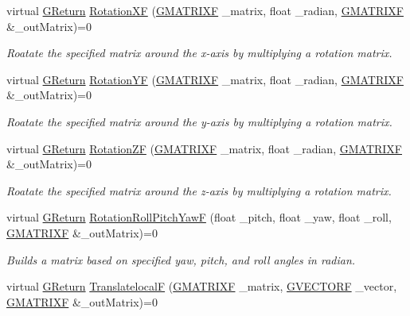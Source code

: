 \begin{DoxyCompactItemize}
virtual \hyperlink{namespaceGW_a67a839e3df7ea8a5c5686613a7a3de21}{G\+Return} \hyperlink{classGW_1_1MATH_1_1GMatrix_acd8ef29804a2d807876b2f0a22a1f9b4}{Rotation\+XF} (\hyperlink{structGW_1_1MATH_1_1GMATRIXF}{G\+M\+A\+T\+R\+I\+XF} \+\_\+matrix, float \+\_\+radian, \hyperlink{structGW_1_1MATH_1_1GMATRIXF}{G\+M\+A\+T\+R\+I\+XF} \&\+\_\+out\+Matrix)=0
\begin{DoxyCompactList}\small\item\em Roatate the specified matrix around the x-\/axis by multiplying a rotation matrix. \end{DoxyCompactList}\item 
virtual \hyperlink{namespaceGW_a67a839e3df7ea8a5c5686613a7a3de21}{G\+Return} \hyperlink{classGW_1_1MATH_1_1GMatrix_afe5fa5399691dc690272dad5d3697ff9}{Rotation\+YF} (\hyperlink{structGW_1_1MATH_1_1GMATRIXF}{G\+M\+A\+T\+R\+I\+XF} \+\_\+matrix, float \+\_\+radian, \hyperlink{structGW_1_1MATH_1_1GMATRIXF}{G\+M\+A\+T\+R\+I\+XF} \&\+\_\+out\+Matrix)=0
\begin{DoxyCompactList}\small\item\em Roatate the specified matrix around the y-\/axis by multiplying a rotation matrix. \end{DoxyCompactList}\item 
virtual \hyperlink{namespaceGW_a67a839e3df7ea8a5c5686613a7a3de21}{G\+Return} \hyperlink{classGW_1_1MATH_1_1GMatrix_abce415225da8aa2592e1ef495fd9996b}{Rotation\+ZF} (\hyperlink{structGW_1_1MATH_1_1GMATRIXF}{G\+M\+A\+T\+R\+I\+XF} \+\_\+matrix, float \+\_\+radian, \hyperlink{structGW_1_1MATH_1_1GMATRIXF}{G\+M\+A\+T\+R\+I\+XF} \&\+\_\+out\+Matrix)=0
\begin{DoxyCompactList}\small\item\em Roatate the specified matrix around the z-\/axis by multiplying a rotation matrix. \end{DoxyCompactList}\item 
virtual \hyperlink{namespaceGW_a67a839e3df7ea8a5c5686613a7a3de21}{G\+Return} \hyperlink{classGW_1_1MATH_1_1GMatrix_aed737b57ce27fc9aeb984e23982b992a}{Rotation\+Roll\+Pitch\+YawF} (float \+\_\+pitch, float \+\_\+yaw, float \+\_\+roll, \hyperlink{structGW_1_1MATH_1_1GMATRIXF}{G\+M\+A\+T\+R\+I\+XF} \&\+\_\+out\+Matrix)=0
\begin{DoxyCompactList}\small\item\em Builds a matrix based on specified yaw, pitch, and roll angles in radian. \end{DoxyCompactList}\item 
virtual \hyperlink{namespaceGW_a67a839e3df7ea8a5c5686613a7a3de21}{G\+Return} \hyperlink{classGW_1_1MATH_1_1GMatrix_aee43c6ff9c28dbac026b529bef61c236}{TranslatelocalF} (\hyperlink{structGW_1_1MATH_1_1GMATRIXF}{G\+M\+A\+T\+R\+I\+XF} \+\_\+matrix, \hyperlink{structGW_1_1MATH_1_1GVECTORF}{G\+V\+E\+C\+T\+O\+RF} \+\_\+vector, \hyperlink{structGW_1_1MATH_1_1GMATRIXF}{G\+M\+A\+T\+R\+I\+XF} \&\+\_\+out\+Matrix)=0

\end{DoxyCompactItemize}
